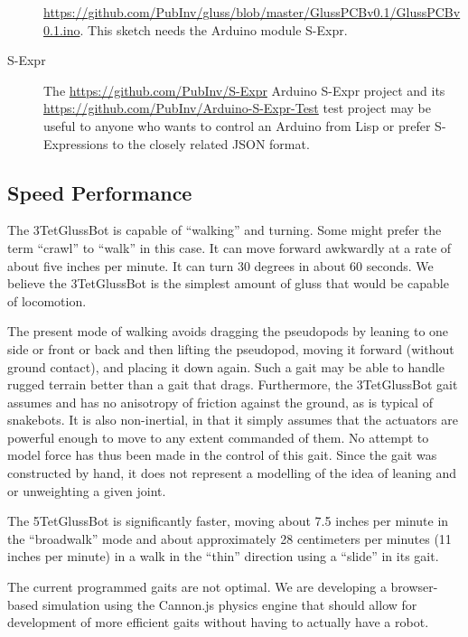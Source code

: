 \documentclass[11pt]{article}
\begin{document}
\begin{description}
\href{https://github.com/PubInv/gluss/blob/master/GlussPCBv0.1/GlussPCBv0.1.ino}
     {https://github.com/PubInv/gluss/blob/master/GlussPCBv0.1/GlussPCBv0.1.ino}.
     This sketch needs the Arduino module S-Expr.
     
\item [S-Expr]
  The \href{https://github.com/PubInv/S-Expr}{https://github.com/PubInv/S-Expr} Arduino S-Expr project and its
  \href{https://github.com/PubInv/Arduino-S-Expr-Test}{https://github.com/PubInv/Arduino-S-Expr-Test} test project
  may be useful to anyone who wants to control an Arduino from Lisp or prefer S-Expressions to the closely related JSON format.

  
\end{description}

\subsection{Speed Performance}

The 3TetGlussBot is capable of ``walking'' and turning. Some might prefer the term ``crawl'' to ``walk'' in
this case. It can move forward awkwardly at a rate
of about five inches per minute. It can turn 30 degrees in about 60 seconds.
We believe the 3TetGlussBot is the simplest amount of gluss that would be capable of locomotion.

The present mode of walking avoids dragging the pseudopods by leaning to one side or front or back and
then lifting the pseudopod, moving it forward (without ground contact), and placing it down again.
Such a gait may be able to handle rugged terrain better than a gait that drags. Furthermore, the
3TetGlussBot gait assumes and has no anisotropy of friction against the ground, as is typical
of snakebots.
It is also non-inertial, in that it simply assumes that the actuators are powerful enough to
move to any extent commanded of them. No attempt to model force has thus been made in the control of this gait.
Since the gait was constructed by hand, it does not represent a modelling of the idea of leaning and or
unweighting a given joint.

The 5TetGlussBot is significantly faster, moving about 7.5 inches per minute in the ``broadwalk'' mode
and about approximately 28 centimeters per minutes (11 inches per minute) in a walk in the ``thin'' direction using a ``slide'' in its gait.

The current programmed gaits are not optimal.
We are developing a browser-based simulation using the Cannon.js physics engine that should allow for development
of more efficient gaits without having to actually have a robot.
\end{document}

